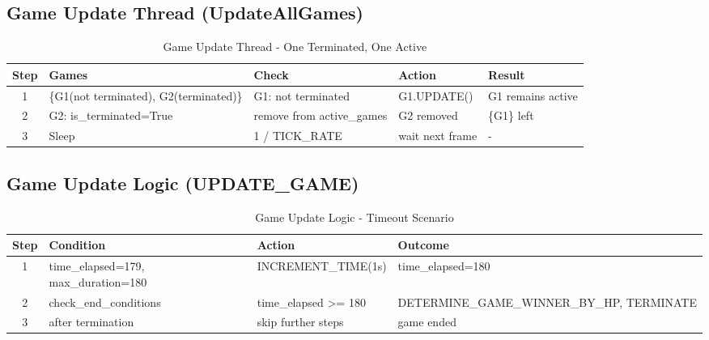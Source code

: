\documentclass{article}
\begin{document}
\subsection{Game Update Thread (UpdateAllGames)}
\begin{table}[H]
\centering
\footnotesize
\begin{tabular}{|c|l|l|l|l|}
\hline
\textbf{Step} & \textbf{Games} & \textbf{Check} & \textbf{Action} & \textbf{Result}\\
\hline
1 & \{G1(not terminated), G2(terminated)\} & G1: not terminated & G1.UPDATE() & G1 remains active \\
\hline
2 & G2: is\_terminated=True & remove from active\_games & G2 removed & \{G1\} left \\
\hline
3 & Sleep & 1 / TICK\_RATE & wait next frame & - \\
\hline
\end{tabular}
\caption{Game Update Thread - One Terminated, One Active}
\end{table}

\subsection{Game Update Logic (UPDATE\_GAME)}
\begin{table}[H]
\centering
\footnotesize
\begin{tabular}{|c|l|l|l|}
\hline
\textbf{Step} & \textbf{Condition} & \textbf{Action} & \textbf{Outcome}\\
\hline
1 & time\_elapsed=179, max\_duration=180 & INCREMENT\_TIME(1s) & time\_elapsed=180 \\
\hline
2 & check\_end\_conditions & time\_elapsed >= 180 & DETERMINE\_GAME\_WINNER\_BY\_HP, TERMINATE \\
\hline
3 & after termination & skip further steps & game ended \\
\hline
\end{tabular}
\caption{Game Update Logic - Timeout Scenario}
\end{table}
\end{document}
